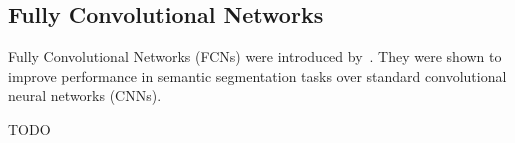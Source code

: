 
\subsection{Fully Convolutional Networks}\label{sec:ap5}

Fully Convolutional Networks (FCNs) were introduced by~\cite{long2015fully}.
They were shown to improve performance in semantic segmentation tasks over
standard convolutional neural networks (CNNs).

TODO
